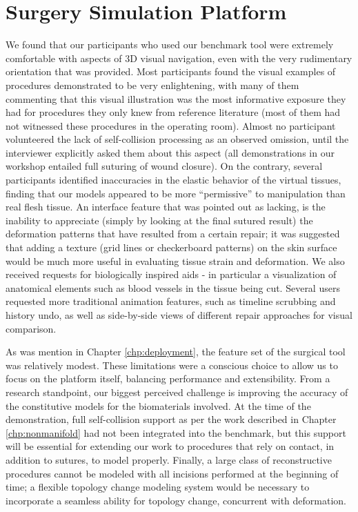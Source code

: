 \section{Surgery Simulation Platform}

We found that our participants who used our benchmark tool were
extremely comfortable with aspects of 3D visual navigation, even with
the very rudimentary orientation that was provided. Most participants
found the visual examples of procedures demonstrated to be very
enlightening, with many of them commenting that this visual
illustration was the most informative exposure they had for procedures
they only knew from reference literature (most of them had not
witnessed these procedures in the operating room). Almost no
participant volunteered the lack of self-collision processing as an
observed omission, until the interviewer explicitly asked them about
this aspect (all demonstrations in our workshop entailed full suturing
of wound closure). On the contrary, several participants identified
inaccuracies in the elastic behavior of the virtual tissues, finding
that our models appeared to be more ``permissive'' to manipulation
than real flesh tissue. An interface feature that was pointed out as
lacking, is the inability to appreciate (simply by looking at the
final sutured result) the deformation patterns that have resulted from
a certain repair; it was suggested that adding a texture (grid lines
or checkerboard patterns) on the skin surface would be much more
useful in evaluating tissue strain and deformation. We also received
requests for biologically inspired aids - in particular a
visualization of anatomical elements such as blood vessels in the
tissue being cut. Several users requested more traditional animation
features, such as timeline scrubbing and history undo, as well as
side-by-side views of different repair approaches for visual
comparison.

As was mention in Chapter \ref{chp:deployment}, the feature set of the
surgical tool was relatively modest. These limitations were a
conscious choice to allow us to focus on the platform itself,
balancing performance and extensibility. From a research standpoint,
our biggest perceived challenge is improving the accuracy of the
constitutive models for the biomaterials involved. At the time of the
demonstration, full self-collision support as per the work described
in Chapter \ref{chp:nonmanifold} had not been integrated into the
benchmark, but this support will be essential for extending our work
to procedures that rely on contact, in addition to sutures, to model
properly. Finally, a large class of reconstructive procedures cannot
be modeled with all incisions performed at the beginning of time; a
flexible topology change modeling system would be necessary to
incorporate a seamless ability for topology change, concurrent with
deformation.

